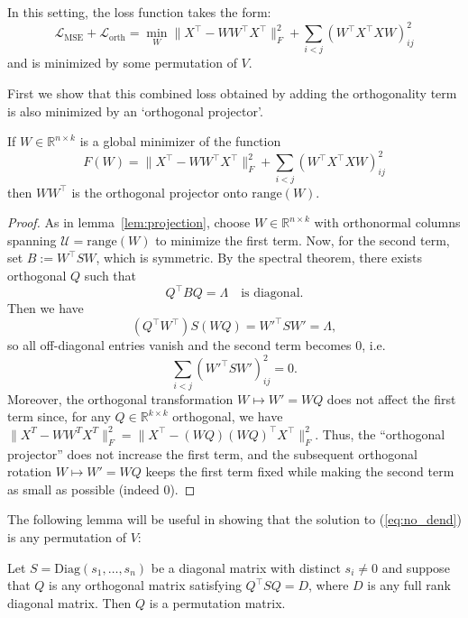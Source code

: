 \documentclass[twoside,11pt]{article}
\begin{document}
In this setting, the loss function takes the form:
\begin{equation}
\label{eq:no_dend}
    \mathcal{L}_{\text{MSE}} + \mathcal{L}_{\text{orth}}= \min_{W}\|X^\top-WW^\top X^\top\|_F^2+\sum_{i<j}(W^\top X^\top XW)_{ij}^2
\end{equation} and is minimized by some permutation of $V$.

First we show that this combined loss obtained by adding the orthogonality term is also minimized by an `orthogonal projector'.

\begin{lemma}
    If $W \in \mathbb{R}^{n\times k}$ is a global minimizer of the function
\[
    F(W)=\|X^\top-WW^\top X^\top\|_F^2+\sum_{i<j}(W^\top X^\top XW)_{ij}^2
\] then $WW^\top$ is the orthogonal projector onto $\mathrm{range}(W)$. 
\label{lem:projection_orth}
\end{lemma}
\begin{proof}

As in lemma~\ref{lem:projection}, choose $ W\in\mathbb{R}^{n\times k}$ with orthonormal columns spanning $\mathcal{U}=\mathrm{range}(W)$ to minimize the first term. Now, for the second term, set $B:= W^{\top}S W$, which is symmetric. By the spectral theorem, there exists orthogonal $Q$ such that
\[
Q^\top BQ=\Lambda
\quad\text{is diagonal}.
\] Then we have
\[
(Q^\top W^\top) S (WQ) = W'^\top S W' = \Lambda,
\]
so all off-diagonal entries vanish and the second term becomes $0$, i.e.
\[
\sum_{i<j}(W'^\top S W')_{ij}^2=0.
\]
Moreover, the orthogonal transformation $W\mapsto W'= WQ$ does not affect the first term since, for any $Q\in \mathbb{R}^{k\times k}$ orthogonal, we have $\|X^T-WW^TX^T\|_F^2 = \|X^\top-(WQ)(WQ)^\top X^\top\|_F^2$. Thus, the ``orthogonal projector'' does not increase the first term, and the subsequent orthogonal rotation $ W\mapsto W'= WQ$ keeps the first term fixed while making the second term as small as possible (indeed $0$).
\end{proof}

The following lemma will be useful in showing that the solution to (\ref{eq:no_dend}) is any permutation of $V$:
\begin{lemma}
    Let $S = \text{{Diag}}(s_1, \dots, s_n)$ be a diagonal matrix with distinct $s_i\ne0$ and suppose that $Q$ is any orthogonal matrix satisfying $Q^\top SQ = D$, where $D$ is any full rank diagonal matrix. Then $Q$ is a permutation matrix.
    \label{lem:diagonals}
\end{lemma}
\end{document}
